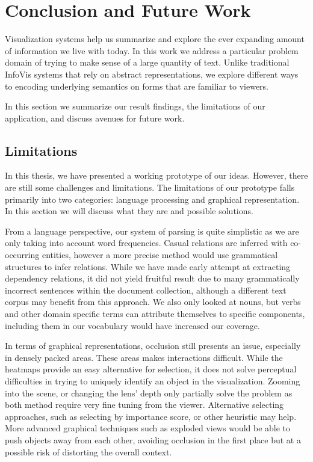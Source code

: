 \chapter{Conclusion and Future Work}
Visualization systems help us summarize and explore the ever expanding amount of
information we live with today. In this work we address a particular problem
domain of trying to make sense of a large quantity of text. Unlike traditional
InfoVis systems that rely on abstract representations, we explore different ways
to encoding underlying semantics on forms that are familiar to viewers. 

In this section we summarize our result findings, the limitations of our
application, and discuss avenues for future work.

\section{Limitations}
In this thesis, we have presented a working prototype of our ideas. However,
there are still some challenges and limitations. The limitations of our
prototype falls primarily into two categories: language processing and graphical
representation. In this section we will discuss what they are and possible
solutions.

From a language perspective, our system of parsing is quite simplistic as we are
only taking into account word frequencies. Casual relations are inferred with
co-occurring entities, however a more precise method would use grammatical
structures to infer relations. While we have made early attempt at extracting
dependency relations, it did not yield fruitful result due to many grammatically
incorrect sentences within the document collection, although a different text
corpus may benefit from this approach. We also only looked at nouns, but verbs
and other domain specific terms can attribute themselves to specific components,
including them in our vocabulary would have increased our coverage.

In terms of graphical representations, occlusion still presents an issue,
especially in densely packed areas. These areas makes interactions difficult.
While the heatmaps provide an easy alternative for selection, it does not solve
perceptual difficulties in trying to uniquely identify an object in the
visualization. Zooming into the scene, or changing the lens' depth only
partially solve the problem as both method require very fine tuning from the
viewer. Alternative selecting approaches, such as selecting by importance score,
or other heuristic may help. More advanced graphical techniques such as exploded
views would be able to push objects away from each other, avoiding occlusion in
the first place but at a possible risk of distorting the overall context.


